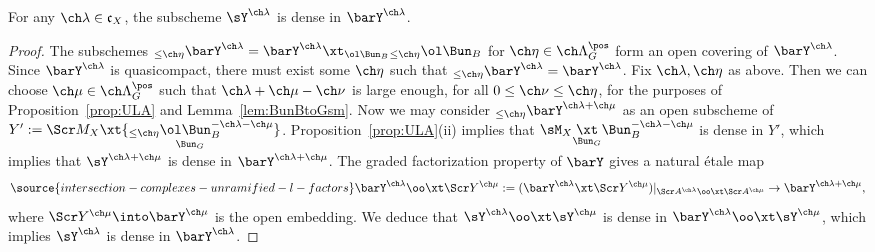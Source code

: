 \begin{cor}
\notready \label{cor:barYdense}
For any $\ch\lambda\in \mathfrak c_X$,
the subscheme $\sY^{\ch\lambda}$ is dense in $\barY^{\ch\lambda}$.
\end{cor}

\begin{proof}
The subschemes $_{\le \ch\eta}\barY^{\ch\lambda} = \barY^{\ch\lambda} \xt_{\ol\Bun_B} {_{\le\ch\eta}}\ol\Bun_B$
for $\ch\eta\in \ch\Lambda^\pos_G$ form an open covering of $\barY^{\ch\lambda}$.
Since $\barY^{\ch\lambda}$ is quasicompact, there must exist some
$\ch\eta$ such that $_{\le \ch\eta}\barY^{\ch\lambda} = \barY^{\ch\lambda}$.
Fix $\ch\lambda,\ch\eta$ as above. Then we can choose
$\ch\mu \in \ch\Lambda^\pos_G$ such that $\ch\lambda+\ch\mu-\ch\nu$ is
large enough, for all $0 \le \ch\nu\le \ch\eta$, for the purposes of
Proposition~\ref{prop:ULA} and Lemma~\ref{lem:BunBtoGsm}.
Now we may consider
$_{\le\ch\eta}\barY^{\ch\lambda+\ch\mu}$ as an open subscheme of
$Y':=\Scr M_X \underset{\Bun_G}\xt {_{\le \ch\eta}\ol\Bun^{-\ch\lambda-\ch\mu}_B}$.
Proposition~\ref{prop:ULA}(ii) implies that
$\sM_X \underset{\Bun_G}\xt \Bun_B^{-\ch\lambda-\ch\mu}$
is dense in $Y'$,
which implies that $\sY^{\ch\lambda+\ch\mu}$ is dense in $\barY^{\ch\lambda+\ch\mu}$.
The graded factorization property of $\barY$
gives a natural \'etale map
\begin{equation} \label{e:barYfactorlarge}
\source{intersection-complexes-unramified-l-factors}
 \barY^{\ch\lambda} \oo\xt \Scr Y^{\ch\mu} := (\barY^{\ch\lambda} \xt \Scr Y^{\ch\mu})|_{\Scr A^{\ch\lambda} \oo\xt \Scr A^{\ch\mu}} \to
\barY^{\ch\lambda+\ch\mu},
\end{equation}
where $\Scr Y^{\ch\mu} \into \barY^{\ch\mu}$
is the open embedding. We deduce that $\sY^{\ch\lambda} \oo\xt \sY^{\ch\mu}$ is
dense in $\barY^{\ch\lambda} \oo\xt \sY^{\ch\mu}$, which implies
$\sY^{\ch\lambda}$ is dense in $\barY^{\ch\lambda}$.

\end{proof}

